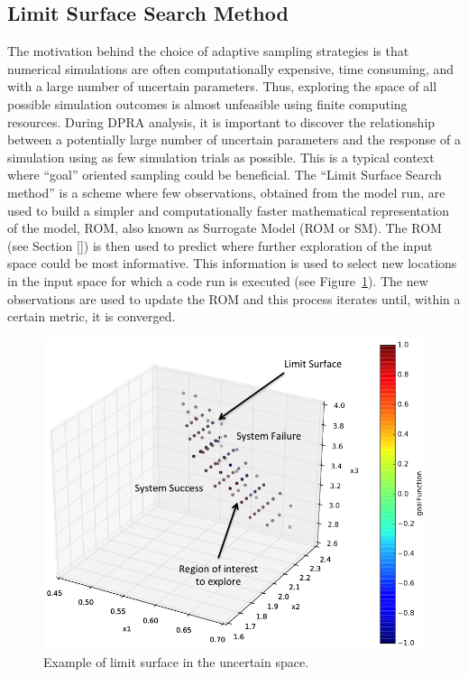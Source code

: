 \subsection{Limit Surface Search Method}
\label{sub:LS}
The motivation behind the choice of adaptive sampling strategies is that numerical 
simulations are often computationally expensive, time consuming, and 
with a large number of uncertain parameters. Thus, exploring the space 
of all possible simulation outcomes is almost unfeasible using finite 
computing resources. During DPRA analysis, it is 
important to discover the relationship between a potentially large 
number of uncertain parameters and the response of a simulation using 
as few simulation trials as possible.
This is a typical context where ``goal'' oriented sampling could be 
beneficial. The ``Limit 
Surface Search method'' is a scheme  where few observations, obtained 
from the model run, are used to build a simpler and computationally faster 
mathematical representation of the model, ROM, also 
known as Surrogate Model (ROM or SM). The ROM (see Section \ref{}) is then 
used to predict where further exploration of the input space could be 
most informative. This information is used to select new locations in the 
input space for which a code run is executed (see 
Figure~\ref{fig:ExampleLSschematic}). The new 
observations are used to update the ROM and this process iterates 
until, within a certain metric, it is converged.
\begin{figure}[h!]
  \centering
  \includegraphics[width=1.0\textwidth]  {pics/ExampleLSschematic.png}
  \caption{Example of limit surface in the uncertain space.}
  \label{fig:ExampleLSschematic}
\end{figure}

